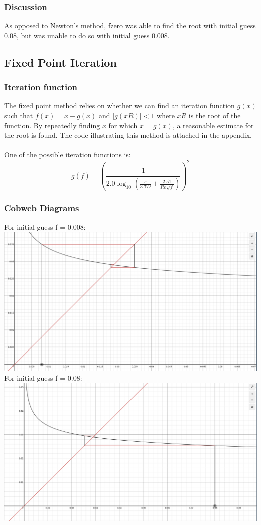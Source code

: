 \documentclass[openany]{book}
\begin{document}
    \subsubsection{Discussion}
    As opposed to Newton's method, fzero was able to find the root with initial guess 0.08, but was unable to do so with initial guess 0.008.
    \subsection{Fixed Point Iteration}
    \subsubsection{Iteration function}
    The fixed point method relies on whether we can find an iteration function ${g(x)}$ such that ${f(x) = x - g(x)}$ and ${|g(xR)| < 1}$ where ${xR}$ is the root of the function. By repeatedly finding ${x}$ for which ${x = g(x)}$, a reasonable estimate for the root is found. The code illustrating this method is attached in the appendix.\\
    \\
    One of the possible iteration functions is: \\
    \[ g(f) = \left(\frac{1}{2.0 \log_{10} \left(\frac{\varepsilon}{3.7D} + \frac{2.51}{\textit{Re}\sqrt{f}}\right)}\right)^2 \]
    \subsubsection{Cobweb Diagrams}
    For initial guess f = 0.008: \\
    \includegraphics[scale=0.2]{second.png}\\
    For initial guess f = 0.08: \\
    \includegraphics[scale=0.2]{first.png}\\
\end{document}
